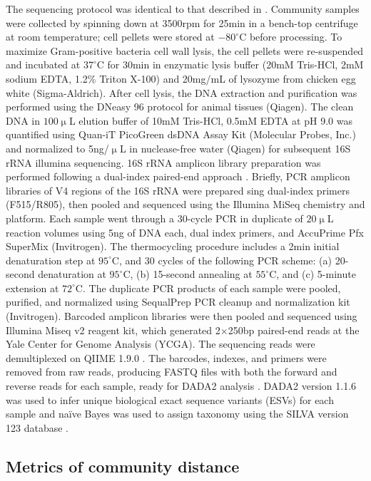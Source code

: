 \documentclass[a4paper,10pt]{article}
\begin{document}
The sequencing protocol was identical to that described in \cite{Goldford2018}.
Community samples were collected by spinning down at 3500rpm for 25min
in a bench-top centrifuge at room temperature;
cell pellets were stored at $-80^\circ$C before processing.
To maximize Gram-positive bacteria cell wall lysis,
the cell pellets were re-suspended and incubated at $37^\circ$C for 30min
in enzymatic lysis buffer (20mM Tris-HCl, 2mM sodium EDTA, 1.2\% Triton X-100)
and 20mg/mL of lysozyme from chicken egg white (Sigma-Aldrich).
After cell lysis, the DNA extraction and purification was performed using the
DNeasy 96 protocol for animal tissues (Qiagen).
The clean DNA in $100\upmu$L elution buffer of 10mM Tris-HCl, 0.5mM EDTA
at pH 9.0 was quantified using Quan-iT PicoGreen dsDNA Assay Kit
(Molecular Probes, Inc.)
and normalized to 5ng/$\upmu$L in nuclease-free water (Qiagen)
for subsequent 16S rRNA illumina sequencing.
16S rRNA amplicon library preparation was performed following a dual-index
paired-end approach \cite{Kozich2013}.
Briefly, PCR amplicon libraries of V4 regions of the 16S rRNA were prepared 
sing dual-index primers (F515/R805), then pooled and sequenced
using the Illumina MiSeq chemistry and platform.
Each sample went through a 30-cycle PCR in duplicate of $20\upmu$L
reaction volumes using 5ng of DNA each, dual index primers, and AccuPrime Pfx SuperMix (Invitrogen).
The thermocycling procedure includes a 2min initial denaturation step at
$95^\circ$C, and 30 cycles of the following PCR scheme:
(a) 20-second denaturation at $95^\circ$C,
(b) 15-second annealing at $55^\circ$C,
and (c) 5-minute extension at $72^\circ$C.
The duplicate PCR products of each sample were pooled, purified, and normalized
using SequalPrep PCR cleanup and normalization kit (Invitrogen).
Barcoded amplicon libraries were then pooled and sequenced using
Illumina Miseq v2 reagent kit, which generated 2$\times$250bp paired-end reads
at the Yale Center for Genome Analysis (YCGA).
The sequencing reads were demultiplexed on QIIME 1.9.0 \cite{Caporaso2010}.
The barcodes, indexes, and primers were removed from raw reads,
producing FASTQ files with both the forward and reverse reads for each sample,
ready for DADA2 analysis \cite{Callahan2017}.
DADA2 version 1.1.6 was used to infer unique biological exact sequence variants
(ESVs) for each sample
and na{\"i}ve Bayes was used to assign taxonomy using the SILVA version 123
database \cite{Wang2007,Quast2013}.

\subsection*{Metrics of community distance}
\label{methods:metrics}
\end{document}
